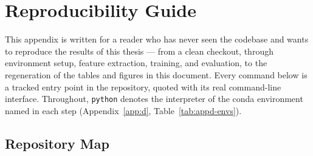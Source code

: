 \chapter{Reproducibility Guide}
\label{app:e}

This appendix is written for a reader who has never seen the codebase and
wants to reproduce the results of this thesis --- from a clean checkout,
through environment setup, feature extraction, training, and evaluation, to
the regeneration of the tables and figures in this document. Every command
below is a tracked entry point in the repository, quoted with its real
command-line interface. Throughout, \texttt{python} denotes the interpreter of
the conda environment named in each step (Appendix~\ref{app:d},
Table~\ref{tab:appd-envs}).

\section{Repository Map}
\label{sec:appe-repomap}

